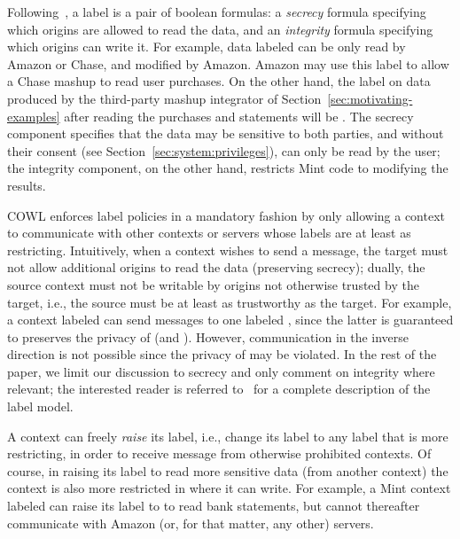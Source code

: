 Following~\cite{yang:2013:towards, stefan:2011:dclabels}, a label is a
pair of boolean formulas: a \emph{secrecy} formula specifying which
origins are allowed to read the data, and an \emph{integrity} formula
specifying which origins can write it.
%
For example, data labeled 
can be only read by Amazon or Chase, and modified by Amazon.
%
Amazon may use this label to allow a Chase mashup to read
user purchases.
%
On the other hand, the label on data produced by the third-party
mashup integrator of Section~\ref{sec:motivating-examples} after
reading the purchases and statements will be
.
%
The secrecy component specifies that the data may be sensitive to both
parties, and without their consent (see
Section~\ref{sec:system:privileges}), can only be read by the user;
the integrity component, on the other hand, restricts Mint code to
modifying the results.
 
COWL enforces label policies in a mandatory fashion by only allowing a
context to communicate with other contexts or servers whose labels are
at least as restricting.
%
Intuitively, when a context wishes to send a message, the target must
not allow additional origins to read the data (preserving secrecy);
dually, the source context must not be writable by origins not
otherwise trusted by the target, i.e., the source must be at least as
trustworthy as the target.
%
For example, a context labeled
 can send messages to
one labeled , since the latter is guaranteed
to preserves the privacy of  (and
).
%
However, communication in the inverse direction is not possible since
the privacy of  may be violated.
%
In the rest of the paper, we limit our discussion to secrecy and only
comment on integrity where relevant; the interested reader is referred
to~\cite{stefan:2011:dclabels} for a complete description of the label
model.

A context can freely \emph{raise} its label, i.e., change its label to
any label that is more restricting, in order to receive message
from otherwise prohibited contexts.
%
Of course, in raising its label to read more sensitive data (from
another context) the context is also more restricted in where it can
write.
%
For example, a Mint context labeled
 can raise its label to
 to read bank statements, but
cannot thereafter communicate with Amazon (or, for that matter, any
other) servers.

